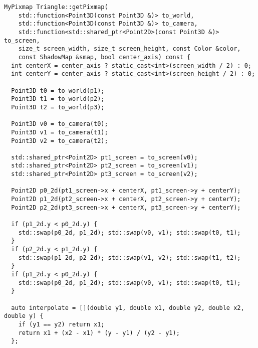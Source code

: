 \iffalse
\begin{lstlisting}[caption={Растеризация треугольника --- начало}, label={lst:render_triangle}]
MyPixmap Triangle::getPixmap(
    std::function<Point3D(const Point3D &)> to_world,
    std::function<Point3D(const Point3D &)> to_camera,
    std::function<std::shared_ptr<Point2D>(const Point3D &)> to_screen,
    size_t screen_width, size_t screen_height, const Color &color,
    const ShadowMap &smap, bool center_axis) const {
  int centerX = center_axis ? static_cast<int>(screen_width / 2) : 0;
  int centerY = center_axis ? static_cast<int>(screen_height / 2) : 0;

  Point3D t0 = to_world(p1); 
  Point3D t1 = to_world(p2); 
  Point3D t2 = to_world(p3);

  Point3D v0 = to_camera(t0); 
  Point3D v1 = to_camera(t1); 
  Point3D v2 = to_camera(t2);

  std::shared_ptr<Point2D> pt1_screen = to_screen(v0);
  std::shared_ptr<Point2D> pt2_screen = to_screen(v1);
  std::shared_ptr<Point2D> pt3_screen = to_screen(v2);

  Point2D p0_2d(pt1_screen->x + centerX, pt1_screen->y + centerY);
  Point2D p1_2d(pt2_screen->x + centerX, pt2_screen->y + centerY);
  Point2D p2_2d(pt3_screen->x + centerX, pt3_screen->y + centerY);

  if (p1_2d.y < p0_2d.y) {
    std::swap(p0_2d, p1_2d); std::swap(v0, v1); std::swap(t0, t1);
  }
  if (p2_2d.y < p1_2d.y) {
    std::swap(p1_2d, p2_2d); std::swap(v1, v2); std::swap(t1, t2);
  }
  if (p1_2d.y < p0_2d.y) {
    std::swap(p0_2d, p1_2d); std::swap(v0, v1); std::swap(t0, t1);
  }

  auto interpolate = [](double y1, double x1, double y2, double x2, double y) {
    if (y1 == y2) return x1;
    return x1 + (x2 - x1) * (y - y1) / (y2 - y1);
  };
\end{lstlisting}
